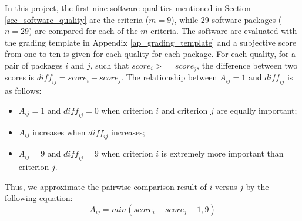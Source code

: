 In this project, the first nine software qualities mentioned in Section \ref{sec_software_quality} are the criteria ($m = 9$), while 29 software packages ($n = 29$) are compared for each of the $m$ criteria. The software are evaluated with the grading template in Appendix \ref{ap_grading_template} and a subjective score from one to ten is given for each quality for each package. For each quality, for a pair of packages $i$ and $j$, such that $score_i >= score_j$, the difference between two scores is $\mathit{diff_{ij}} = score_i - score_j$. The relationship between $A_{ij} = 1$ and $\mathit{diff_{ij}}$ is as follows:
\begin{itemize}
\item $A_{ij} = 1$ and $\mathit{diff_{ij}} = 0$ when criterion $i$ and criterion $j$ are equally important;
\item $A_{ij}$ increases when $\mathit{diff_{ij}}$ increases;
\item $A_{ij} = 9$ and $\mathit{diff_{ij}} = 9$ when criterion $i$ is extremely more important than criterion $j$.
\end{itemize}
Thus, we approximate the pairwise comparison result of $i$ versus $j$ by the following equation:
\begin{equation}
A_{ij} = min(score_i - score_j + 1, 9)
\end{equation}
